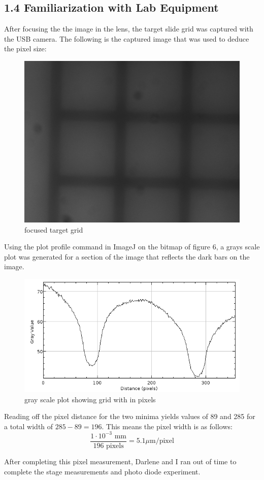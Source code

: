 \documentclass[letter, 11pt, onecolumn]{article}
\begin{document}
		\subsection*{1.4 Familiarization with Lab Equipment}
		After focusing the the image in the lens, the target slide grid was captured with the USB camera. The following is the captured image that was used to deduce the pixel size: 
			\begin{figure}[h!]
				\centering
				\includegraphics[width=0.5\columnwidth]{pixelSize}
				\caption{focused target grid}
			\end{figure}
			
		Using the plot profile command in ImageJ on the bitmap of figure 6, a grays scale plot was generated for a section of the image that reflects the dark bars on the image.  
			\begin{figure}[h!]
				\centering
				\includegraphics[width=0.75\columnwidth]{pixelSizePlot}
				\caption{gray scale plot showing grid with in pixels}
			\end{figure}
		
		Reading off the pixel distance for the two minima yields values of 89 and 285 for a total width of $285-89=196$. This means the pixel width is as follows: 
			\begin{equation}
				\frac{1\cdot10^{-3}\text{ mm}}{196 \text{ pixels}} = 5.1 \mu  \text{m/pixel}
			\end{equation}
			
		\noindent After completing this pixel measurement, Darlene and I ran out of time to complete the stage measurements and photo diode experiment.
\end{document}
